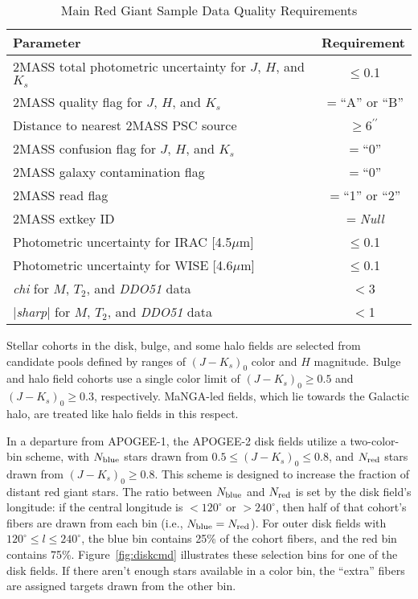 \documentclass[12pt,twocolumn]{emulateapj}
\begin{document}
\begin{table*}[hpbt]
  \begin{center}
  \caption{Main Red Giant Sample Data Quality Requirements}
  \begin{tabular}{l c}
Parameter & Requirement \\
  \hline
2MASS total photometric uncertainty for $J$, $H$, and $K_s$ & $\le$0.1 \\
2MASS quality flag for $J$, $H$, and $K_s$ & $=$``A'' or ``B'' \\
Distance to nearest 2MASS PSC source & $\ge$6$^{\prime\prime}$ \\
2MASS confusion flag for $J$, $H$, and $K_s$ & $=$``0'' \\
2MASS galaxy contamination flag & $=$``0'' \\
2MASS read flag & $=$``1'' or ``2'' \\
2MASS extkey ID & $=${\it Null} \\
Photometric uncertainty for IRAC [4.5$\mu$m] & $\le$0.1 \\
Photometric uncertainty for WISE [4.6$\mu$m] & $\le$0.1 \\
{\it chi} for $M$, $T_2$, and {\it DDO51} data & $<$3 \\
{\it $|$sharp$|$} for $M$, $T_2$, and {\it DDO51} data & $<$1 \\
\hline
  \end{tabular}
  \label{tab:data_quality_reqs}
  \end{center}
\end{table*}

Stellar cohorts in the disk, bulge, and some halo fields are selected from 
candidate pools defined by ranges of $(J-K_s)_0$ color and $H$ magnitude.
Bulge and halo field cohorts use a single color limit of $(J-K_s)_0 \ge 0.5$ and $(J-K_s)_0 \ge  0.3$, respectively.
MaNGA-led fields, which lie towards the Galactic halo, are treated like halo fields in this respect.

In a departure from APOGEE-1, the APOGEE-2 disk fields
utilize a two-color-bin scheme, with $N_{\rm blue}$ stars drawn from $0.5 \le (J-K_s)_0 \le 0.8$, and
$N_{\rm red}$ stars drawn from $(J-K_s)_0 \ge 0.8$.  This scheme is designed to increase the fraction of distant red giant stars.
The ratio between $N_{\rm blue}$ and $N_{\rm red}$ is set by the disk field's longitude: 
if the central longitude is $<120^\circ$ or $>240^\circ$, then half of that cohort's fibers are drawn from each bin (i.e., $N_{\rm blue} = N_{\rm red}$).
For outer disk fields with $120^\circ \le l \le 240^\circ$, the blue bin contains 25\% of the cohort fibers, and the red bin contains 75\%.  Figure~\ref{fig:diskcmd} illustrates these selection bins for one of the disk fields.
If there aren't enough stars available in a color bin, the ``extra'' fibers are assigned targets drawn from the other bin.
\end{document}
